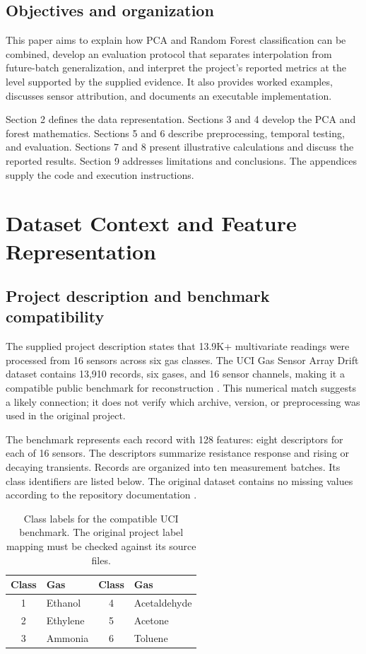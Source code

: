 \documentclass[11pt,a4paper]{article}
\newcommand{\sectionpage}[1]{\clearpage\section{#1}}
\begin{document}
\subsection{Objectives and organization}
This paper aims to explain how PCA and Random Forest classification can be combined, develop an evaluation protocol that separates interpolation from future-batch generalization, and interpret the project's reported metrics at the level supported by the supplied evidence. It also provides worked examples, discusses sensor attribution, and documents an executable implementation.

Section 2 defines the data representation. Sections 3 and 4 develop the PCA and forest mathematics. Sections 5 and 6 describe preprocessing, temporal testing, and evaluation. Sections 7 and 8 present illustrative calculations and discuss the reported results. Section 9 addresses limitations and conclusions. The appendices supply the code and execution instructions.

\sectionpage{Dataset Context and Feature Representation}
\subsection{Project description and benchmark compatibility}
The supplied project description states that 13.9K+ multivariate readings were processed from 16 sensors across six gas classes. The UCI Gas Sensor Array Drift dataset contains 13,910 records, six gases, and 16 sensor channels, making it a compatible public benchmark for reconstruction \cite{uci}. This numerical match suggests a likely connection; it does not verify which archive, version, or preprocessing was used in the original project.

The benchmark represents each record with 128 features: eight descriptors for each of 16 sensors. The descriptors summarize resistance response and rising or decaying transients. Records are organized into ten measurement batches. Its class identifiers are listed below. The original dataset contains no missing values according to the repository documentation \cite{uci}.

\begin{table}[h!]\centering
\begin{tabular}{@{}clcl@{}}\toprule
Class & Gas & Class & Gas\\\midrule
1 & Ethanol & 4 & Acetaldehyde\\
2 & Ethylene & 5 & Acetone\\
3 & Ammonia & 6 & Toluene\\\bottomrule
\end{tabular}
\caption{Class labels for the compatible UCI benchmark. The original project label mapping must be checked against its source files.}
\end{table}
\end{document}
